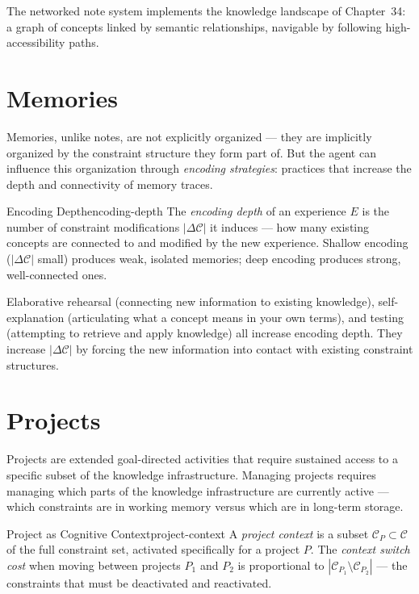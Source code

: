 The networked note system implements the knowledge landscape of
Chapter~34: a graph of concepts linked by semantic relationships,
navigable by following high-accessibility paths.

\section{Memories}

Memories, unlike notes, are not explicitly organized — they are
implicitly organized by the constraint structure they form part of.
But the agent can influence this organization through \emph{encoding
strategies}: practices that increase the depth and connectivity of
memory traces.

\begin{definition}{Encoding Depth}{encoding-depth}
  The \emph{encoding depth} of an experience $E$ is the number of
  constraint modifications $|\Delta\mathcal{C}|$ it induces — how
  many existing concepts are connected to and modified by the new
  experience. Shallow encoding ($|\Delta\mathcal{C}|$ small) produces
  weak, isolated memories; deep encoding produces strong, well-connected ones.
\end{definition}

Elaborative rehearsal (connecting new information to existing knowledge),
self-explanation (articulating what a concept means in your own terms),
and testing (attempting to retrieve and apply knowledge) all increase
encoding depth. They increase $|\Delta\mathcal{C}|$ by forcing the
new information into contact with existing constraint structures.

\section{Projects}

Projects are extended goal-directed activities that require sustained
access to a specific subset of the knowledge infrastructure. Managing
projects requires managing which parts of the knowledge infrastructure
are currently active — which constraints are in working memory versus
which are in long-term storage.

\begin{definition}{Project as Cognitive Context}{project-context}
  A \emph{project context} is a subset $\mathcal{C}_P \subset \mathcal{C}$
  of the full constraint set, activated specifically for a project $P$.
  The \emph{context switch cost} when moving between projects $P_1$
  and $P_2$ is proportional to $|\mathcal{C}_{P_1} \setminus
  \mathcal{C}_{P_2}|$ — the constraints that must be deactivated and
  reactivated.
\end{definition}

